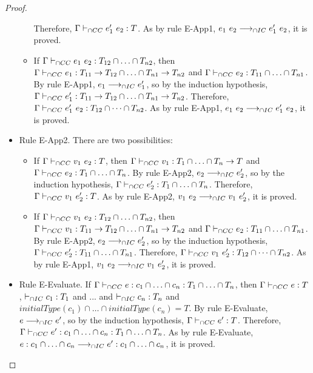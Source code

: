 \documentclass[a4paper]{article}
\begin{document}
\begin{proof}
\begin{itemize}
\begin{itemize}
        Therefore, $\Gamma \vdash_{\cap CC} e_1'\ e_2 : T$.
        As by rule E-App1, $e_1\ e_2 \longrightarrow_{\cap IC} e_1'\ e_2$, it is proved.
        \item If $\Gamma \vdash_{\cap CC} e_1\ e_2 : T_{12} \cap \ldots \cap T_{n2}$, then $\Gamma \vdash_{\cap CC} e_1 : T_{11} \rightarrow T_{12} \cap \ldots \cap T_{n1} \rightarrow T_{n2}$ and $\Gamma \vdash_{\cap CC} e_2 : T_{11} \cap \ldots \cap T_{n1}$.
        By rule E-App1, $e_1 \longrightarrow_{\cap IC} e_1'$, so by the induction hypothesis, $\Gamma \vdash_{\cap CC} e_1' : T_{11} \rightarrow T_{12} \cap \ldots \cap T_{n1} \rightarrow T_{n2}$.
        Therefore, $\Gamma \vdash_{\cap CC} e_1'\ e_2 : T_{12} \cap \dots \cap T_{n2}$.
        As by rule E-App1, $e_1\ e_2 \longrightarrow_{\cap IC} e_1'\ e_2$, it is proved.
    \end{itemize}
    \item Rule E-App2. There are two possibilities:
    \begin{itemize}
        \item If $\Gamma \vdash_{\cap CC} v_1\ e_2 : T$, then $\Gamma \vdash_{\cap CC} v_1 : T_1 \cap \ldots \cap T_n \rightarrow T$ and $\Gamma \vdash_{\cap CC} e_2 : T_1 \cap \ldots \cap T_n$.
        By rule E-App2, $e_2 \longrightarrow_{\cap IC} e_2'$, so by the induction hypothesis, $\Gamma \vdash_{\cap CC} e_2' : T_1 \cap \ldots \cap T_n$.
        Therefore, $\Gamma \vdash_{\cap CC} v_1\ e_2' : T$.
        As by rule E-App2, $v_1\ e_2 \longrightarrow_{\cap IC} v_1\ e_2'$, it is proved.
        \item If $\Gamma \vdash_{\cap CC} v_1\ e_2 : T_{12} \cap \ldots \cap T_{n2}$, then $\Gamma \vdash_{\cap CC} v_1 : T_{11} \rightarrow T_{12} \cap \ldots \cap T_{n1} \rightarrow T_{n2}$ and $\Gamma \vdash_{\cap CC} e_2 : T_{11} \cap \ldots \cap T_{n1}$.
        By rule E-App2, $e_2 \longrightarrow_{\cap IC} e_2'$, so by the induction hypothesis, $\Gamma \vdash_{\cap CC} e_2' : T_{11} \cap \ldots \cap T_{n1}$.
        Therefore, $\Gamma \vdash_{\cap CC} v_1\ e_2' : T_{12} \cap \dots \cap T_{n2}$.
        As by rule E-App1, $v_1\ e_2 \longrightarrow_{\cap IC} v_1\ e_2'$, it is proved.
    \end{itemize}
    \item Rule E-Evaluate. If $\Gamma \vdash_{\cap CC} e : c_1 \cap \ldots \cap c_n : T_1 \cap \ldots \cap T_n$, then $\Gamma \vdash_{\cap CC} e : T$, $\vdash_{\cap IC} c_1 : T_1$ and ... and $\vdash_{\cap IC} c_n : T_n$ and $initialType(c_1) \cap \ldots \cap initialType(c_n) = T$.
    By rule E-Evaluate, $e \longrightarrow_{\cap IC} e'$, so by the induction hypothesis, $\Gamma \vdash_{\cap CC} e' : T$.
    Therefore, $\Gamma \vdash_{\cap CC} e' : c_1 \cap \ldots \cap c_n : T_1 \cap \ldots \cap T_n$.
    As by rule E-Evaluate, $e : c_1 \cap \ldots \cap c_n \longrightarrow_{\cap IC} e' : c_1 \cap \ldots \cap c_n$, it is proved.
\end{itemize}
\end{proof}
\end{document}

